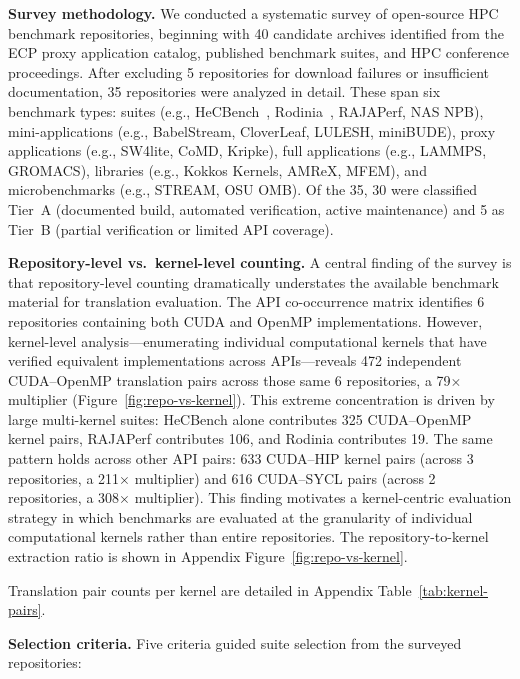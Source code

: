 \documentclass[conference]{IEEEtran}
\begin{document}
\textbf{Survey methodology.} We conducted a systematic survey of open-source HPC benchmark repositories, beginning with 40 candidate archives identified from the ECP proxy application catalog, published benchmark suites, and HPC conference proceedings. After excluding 5 repositories for download failures or insufficient documentation, 35 repositories were analyzed in detail. These span six benchmark types: suites (e.g., HeCBench~\cite{HeCBench2023}, Rodinia~\cite{Rodinia2009}, RAJAPerf, NAS NPB), mini-applications (e.g., BabelStream, CloverLeaf, LULESH, miniBUDE), proxy applications (e.g., SW4lite, CoMD, Kripke), full applications (e.g., LAMMPS, GROMACS), libraries (e.g., Kokkos Kernels, AMReX, MFEM), and microbenchmarks (e.g., STREAM, OSU OMB). Of the 35, 30 were classified Tier~A (documented build, automated verification, active maintenance) and 5 as Tier~B (partial verification or limited API coverage).

\textbf{Repository-level vs.\ kernel-level counting.} A central finding of the survey is that repository-level counting dramatically understates the available benchmark material for translation evaluation. The API co-occurrence matrix identifies 6 repositories containing both CUDA and OpenMP implementations. However, kernel-level analysis---enumerating individual computational kernels that have verified equivalent implementations across APIs---reveals 472 independent CUDA--OpenMP translation pairs across those same 6 repositories, a 79$\times$ multiplier (Figure~\ref{fig:repo-vs-kernel}). This extreme concentration is driven by large multi-kernel suites: HeCBench alone contributes 325 CUDA--OpenMP kernel pairs, RAJAPerf contributes 106, and Rodinia contributes 19. The same pattern holds across other API pairs: 633 CUDA--HIP kernel pairs (across 3 repositories, a 211$\times$ multiplier) and 616 CUDA--SYCL pairs (across 2 repositories, a 308$\times$ multiplier). This finding motivates a kernel-centric evaluation strategy in which benchmarks are evaluated at the granularity of individual computational kernels rather than entire repositories.
The repository-to-kernel extraction ratio is shown in Appendix Figure~\ref{fig:repo-vs-kernel}.

Translation pair counts per kernel are detailed in Appendix Table~\ref{tab:kernel-pairs}.


\textbf{Selection criteria.} Five criteria guided suite selection from the surveyed repositories:
\end{document}
